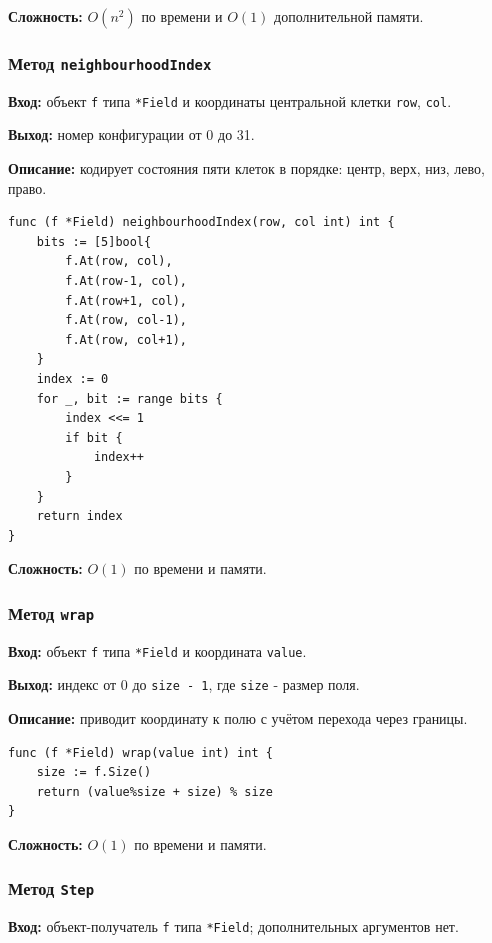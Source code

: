 \textbf{Сложность:} $O(n^2)$ по времени и $O(1)$ дополнительной памяти.

\subsubsection{Метод \texttt{neighbourhoodIndex}}
\textbf{Вход:} объект \texttt{f} типа \texttt{*Field} и координаты
центральной клетки \texttt{row}, \texttt{col}.

\textbf{Выход:} номер конфигурации от 0 до 31.

\textbf{Описание:} кодирует состояния пяти клеток в порядке: центр, верх,
низ, лево, право.

\begin{lstlisting}[style=gostyle,caption={Кодирование конфигурации соседей}]
func (f *Field) neighbourhoodIndex(row, col int) int {
    bits := [5]bool{
        f.At(row, col),
        f.At(row-1, col),
        f.At(row+1, col),
        f.At(row, col-1),
        f.At(row, col+1),
    }
    index := 0
    for _, bit := range bits {
        index <<= 1
        if bit {
            index++
        }
    }
    return index
}
\end{lstlisting}

\textbf{Сложность:} $O(1)$ по времени и памяти.

\subsubsection{Метод \texttt{wrap}}
\textbf{Вход:} объект \texttt{f} типа \texttt{*Field} и координата
\texttt{value}.

\textbf{Выход:} индекс от 0 до \texttt{size - 1}, где \texttt{size} - размер
поля.

\textbf{Описание:} приводит координату к полю с учётом перехода через границы.

\begin{lstlisting}[style=gostyle,caption={Приведение координаты к границам поля}]
func (f *Field) wrap(value int) int {
    size := f.Size()
    return (value%size + size) % size
}
\end{lstlisting}

\textbf{Сложность:} $O(1)$ по времени и памяти.

\subsubsection{Метод \texttt{Step}}
\textbf{Вход:} объект-получатель \texttt{f} типа \texttt{*Field};
дополнительных аргументов нет.

